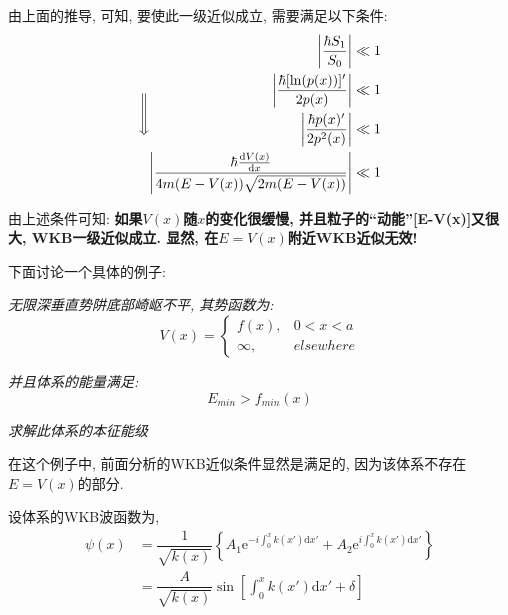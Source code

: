 \documentclass[a4paper, 11pt]{article}
\begin{document}
\begin{spacing}{1.2}
          由上面的推导, 可知, 要使此一级近似成立, 需要满足以下条件:
          \begin{equation}
            \Bigg\Downarrow
            \begin{aligned}
              \left|\dfrac{\hbar{}S_1}{S_0}\right| &\ll 1\\
              \left|\dfrac{\hbar[\ln(p(x))]'}{2p(x)}\right| &\ll 1\\
              \left|\dfrac{\hbar{}p(x)'}{2p^2(x)}\right| &\ll 1\\
              \left|\dfrac{\hbar\frac{\mathrm{d}V(x)}{\mathrm{d}x}}{4m(E-V(x))\sqrt{2m(E-V(x))}}\right| &\ll 1\\
            \end{aligned}
          \end{equation}

          由上述条件可知: \textbf{如果$V(x)$随$x$的变化很缓慢, 并且粒子的``动能''[E-V(x)]又很大, WKB一级近似成立. 
          显然, 在$E=V(x)$附近WKB近似无效!}

          下面讨论一个具体的例子:

          \emph{无限深垂直势阱底部崎岖不平, 其势函数为:}
          \begin{equation}
            V(x) = \left\{\begin{array}{ll}
              f(x), & 0<x<a\\
              \infty, & elsewhere
            \end{array}\right. 
          \end{equation}

          \emph{并且体系的能量满足:}
          \begin{equation}
            E_{min} > f_{min}(x)
          \end{equation}

          \emph{求解此体系的本征能级}

          在这个例子中, 前面分析的WKB近似条件显然是满足的, 因为该体系不存在$E=V(x)$的部分. 

          设体系的WKB波函数为, 
          \begin{equation}
            \begin{aligned}
              \psi(x) &= \dfrac{1}{\sqrt{k(x)}} %
              \left\{A_1\mathrm{e}^{-i\int_0^xk(x')\mathrm{d}x'} + %
                    A_2\mathrm{e}^{i\int_0^xk(x')\mathrm{d}x'}\right\}\\
                    &= \dfrac{A}{\sqrt{k(x)}}\sin\left[\int_0^xk(x')\mathrm{d}x'+\delta\right]
            \end{aligned}
          \end{equation}


\end{spacing}
\end{document}
